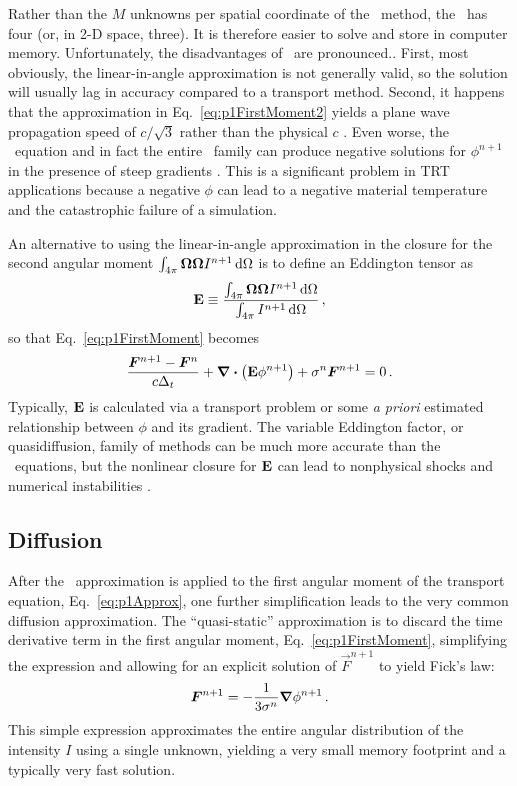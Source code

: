 Rather than the $M$ unknowns per spatial coordinate of the \SN\ method, the
\Pone\ has four (or, in 2-D space, three). It is therefore easier to solve and
store in computer memory. Unfortunately, the disadvantages of \Pone\ are
pronounced..
First, most obviously, the linear-in-angle approximation is not generally valid, so
the solution will
usually lag in accuracy compared to a transport method. Second, it happens that
the approximation in Eq.~\eqref{eq:p1FirstMoment2} yields a plane wave
propagation speed of $c/\sqrt{3}$ rather than the physical $c$
\cite{Mih1984,War2002}. Even worse, the \Pone\ equation and in fact the entire
\PN\ family can produce negative solutions for $\phi^{n+1}$ in the presence of
steep gradients \cite{Bru2002,McC2007,McC2008a}. This is a significant problem
in TRT
applications because a negative $\phi$ can lead to a negative material
temperature and
the catastrophic failure of a simulation.

An alternative to using the linear-in-angle approximation in the closure for the
second angular moment
$\int_{4\pi} \bm{\Omega}\bm{\Omega} I^{n+1} \mathop{}\!\mathrm{d}\Omega$ is to define an
Eddington tensor \cite{Pom1982,Ols2000} as
\begin{equation*}
  \mathbf{E} \equiv \frac{\int_{4\pi} \bm{\Omega}\bm{\Omega} I^{n+1}
  \mathop{}\!\mathrm{d}\Omega}{\int_{4\pi} I^{n+1} \mathop{}\!\mathrm{d}\Omega}\,,
\end{equation*}
so that Eq.~\eqref{eq:p1FirstMoment} becomes
\begin{equation*}
  \frac{\bm{F}^{n+1} - \bm{F}^n }{c \Delta_t}
  + \bm{\nabla} \bm{\cdot} \left( \mathbf{E}\phi^{n+1} \right)
  + \sigma^n \bm{F}^{n+1}
  = 0\,.
\end{equation*}
Typically, $\mathbf{E}$ is calculated via a transport problem or some \emph{a
priori} estimated relationship between $\phi$ and its gradient.
The variable Eddington factor, or quasidiffusion, family of methods can be much
more accurate than the \Pone\ equations, but the nonlinear closure for $\mathbf{E}$
can lead to nonphysical shocks and numerical instabilities \cite{Ols2000}.

\subsection{Diffusion}\label{sec:bgDiffusion}

After the \Pone\ approximation is applied to the first angular moment of the
transport equation, Eq.~\eqref{eq:p1Approx}, one further simplification leads to
the very common diffusion approximation. The ``quasi-static'' \cite{Dud1976}
approximation is to discard the time derivative term in the first angular moment,
Eq.~\eqref{eq:p1FirstMoment}, simplifying the expression and allowing for an
explicit solution of $\vec{F}^{n+1}$ to yield Fick's law:
\begin{equation*}
  \bm{F}^{n+1} = - \frac{1}{3\sigma^n} \bm{\nabla} \phi^{n+1}\,.
\end{equation*}
This simple expression approximates the entire angular distribution of the
intensity $I$ using a single unknown, yielding a very small memory footprint and
a typically very fast solution.

